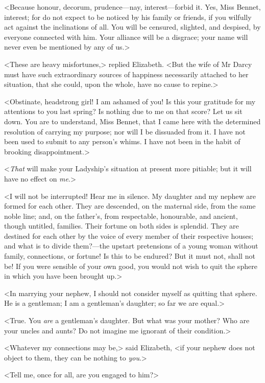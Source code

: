 <Because honour, decorum, prudence—nay, interest—forbid it. Yes, Miss Bennet, interest; for do not expect to be noticed by his family or friends, if you wilfully act against the inclinations of all. You will be censured, slighted, and despised, by everyone connected with him. Your alliance will be a disgrace; your name will never even be mentioned by any of us.>

<These are heavy misfortunes,> replied Elizabeth. <But the wife of Mr Darcy must have such extraordinary sources of happiness necessarily attached to her situation, that she could, upon the whole, have no cause to repine.>

<Obstinate, headstrong girl! I am ashamed of you! Is this your gratitude for my attentions to you last spring? Is nothing due to me on that score? Let us sit down. You are to understand, Miss Bennet, that I came here with the determined resolution of carrying my purpose; nor will I be dissuaded from it. I have not been used to submit to any person's whims. I have not been in the habit of brooking disappointment.>

<\textit{That} will make your Ladyship's situation at present more pitiable; but it will have no effect on \textit{me}.>

<I will not be interrupted! Hear me in silence. My daughter and my nephew are formed for each other. They are descended, on the maternal side, from the same noble line; and, on the father's, from respectable, honourable, and ancient, though untitled, families. Their fortune on both sides is splendid. They are destined for each other by the voice of every member of their respective houses; and what is to divide them?—the upstart pretensions of a young woman without family, connections, or fortune! Is this to be endured? But it must not, shall not be! If you were sensible of your own good, you would not wish to quit the sphere in which you have been brought up.>

<In marrying your nephew, I should not consider myself as quitting that sphere. He is a gentleman; I am a gentleman's daughter; so far we are equal.>

<True. You \textit{are} a gentleman's daughter. But what was your mother? Who are your uncles and aunts? Do not imagine me ignorant of their condition.>

<Whatever my connections may be,> said Elizabeth, <if your nephew does not object to them, they can be nothing to \textit{you}.>

<Tell me, once for all, are you engaged to him?>

